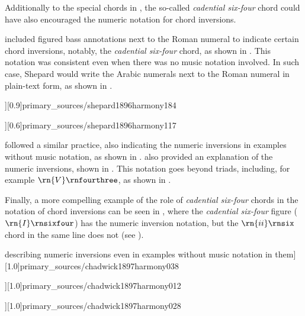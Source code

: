 Additionally to the special chords in
\textcite{emery1879elements}, the so-called \emph{cadential
six-four} chord could have also encouraged the numeric
notation for chord inversions.

\textcite{shepard1896harmony} included figured bass
annotations next to the Roman numeral to indicate certain
chord inversions, notably, the \emph{cadential six-four}
chord, as shown in
. This
notation was consistent even when there was no music
notation involved. In such case, Shepard would write the
Arabic numerals next to the Roman numeral in plain-text
form, as shown in
.

\phdfigure[Numeric inversions in
\textcite[p.~184]{shepard1896harmony}][0.9]{primary_sources/shepard1896harmony184}

\phdfigure[Numeric inversions in plain-text, without
accompanying music notation
\parencite[p.~117]{shepard1896harmony}][0.6]{primary_sources/shepard1896harmony117}

\textcite{chadwick1897harmony} followed a similar practice,
also indicating the numeric inversions in examples without
music notation, as shown in
.
\textcite{chadwick1897harmony} also provided an explanation
of the numeric inversions, shown in
. This
notation goes beyond triads, including, for example
$\rn{V}\rnfourthree$, as shown in
.

Finally, a more compelling example of the role of
\emph{cadential six-four} chords in the notation of chord
inversions can be seen in \textcite{loewengard1908lehrbuch},
where the \emph{cadential six-four} figure
($\rn{I}\rnsixfour$) has the numeric inversion notation, but
the $\rn{ii}\rnsix$ chord in the same line does not (see
).

\phdfigure[\textcite[p.~38]{chadwick1897harmony} describing
numeric inversions even in examples without music notation
in them][1.0]{primary_sources/chadwick1897harmony038}

\phdfigure[Arabic-numeral inversions in
 \textcite[p.~12]{chadwick1897harmony}][1.0]{primary_sources/chadwick1897harmony012}

\phdfigure[A dominant seventh chord in second inversion in
\textcite[p.~28]{chadwick1897harmony}][1.0]{primary_sources/chadwick1897harmony028}

